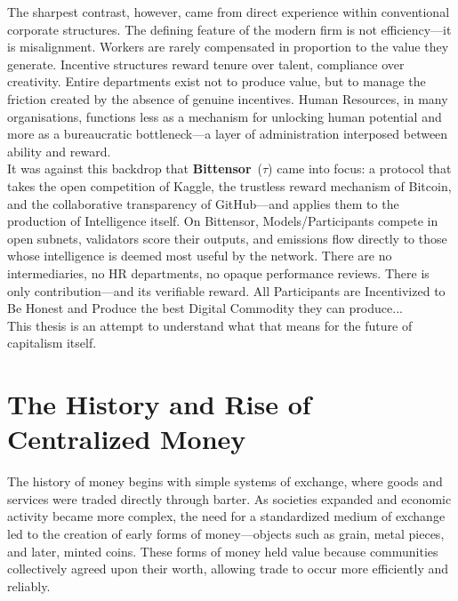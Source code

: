 \documentclass[12pt, a4paper, oneside]{report}
\newcommand{\TAO}{$\tau$}            %
\theoremstyle{definition}
\begin{document}
The sharpest contrast, however, came from direct experience within conventional 
corporate structures. The defining feature of the modern firm is not efficiency—it 
is misalignment. Workers are rarely compensated in proportion to the value they 
generate. Incentive structures reward tenure over talent, compliance over 
creativity. Entire departments exist not to produce value, but to manage the 
friction created by the absence of genuine incentives. Human Resources, in 
many organisations, functions less as a mechanism for unlocking human potential 
and more as a bureaucratic bottleneck—a layer of administration interposed 
between ability and reward.\\

It was against this backdrop that \textbf{Bittensor}~(\TAO) came into focus: 
a protocol that takes the open competition of Kaggle, the trustless reward 
mechanism of Bitcoin, and the collaborative transparency of GitHub—and applies 
them to the production of Intelligence itself. On Bittensor, Models/Participants 
compete in open subnets, validators score their outputs, and emissions flow 
directly to those whose intelligence is deemed most useful by the network. 
There are no intermediaries, no HR departments, no opaque performance reviews. 
There is only contribution—and its verifiable reward.
All Participants are Incentivized to Be Honest and Produce the best Digital Commodity they can produce...\\

This thesis is an attempt to understand what that means for the future of 
capitalism itself.








\chapter{The History and Rise of Centralized Money}
\label{chap:history}

The history of money begins with simple systems of exchange, where goods and services 
were traded directly through barter. As societies expanded and economic activity became 
more complex, the need for a standardized medium of exchange led to the creation of 
early forms of money—objects such as grain, metal pieces, and later, minted coins. 
These forms of money held value because communities collectively agreed upon their 
worth, allowing trade to occur more efficiently and reliably.\\[0.4cm]
\end{document}
